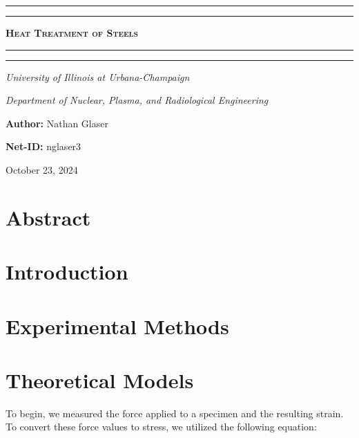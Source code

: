 \documentclass{article}
\begin{document}
\newcommand{\Fig}[3]{\begin{figure}[!h!]\centering\texttt{[image: \#1]}\caption{#2}\label{#3}\end{figure}}
\begin{titlepage}

\centering
\scshape
\vspace{\baselineskip}

%
\rule{\textwidth}{1.6pt}\vspace*{-\baselineskip}\vspace*{2pt}
\rule{\textwidth}{0.4pt}

{\Huge \textbf{\textsc{ Heat Treatment of Steels \\
\vspace{15pt}}}}

\rule{\textwidth}{0.4pt}\vspace*{-\baselineskip}\vspace{3.2pt}
\rule{\textwidth}{1.6pt}\vspace{6pt}
\centerline{\textit{University of Illinois at Urbana-Champaign}} 
\centerline{\textit{Department of Nuclear, Plasma, and Radiological Engineering}}
\vspace{1.5\baselineskip}


\large \centerline{\textbf{Author:} Nathan Glaser}
\large \centerline{\textbf{Net-ID:} nglaser3}
\quad

\vfill
\large \centerline{October 23, 2024}
%
\end{titlepage}

\tableofcontents
\newpage
{}

\section{Abstract}

\section{Introduction}


\section{Experimental Methods}


\section{Theoretical Models}
To begin, we measured the force applied to a specimen and the resulting strain. To convert these force values to stress, we utilized the following equation:
\end{document}

